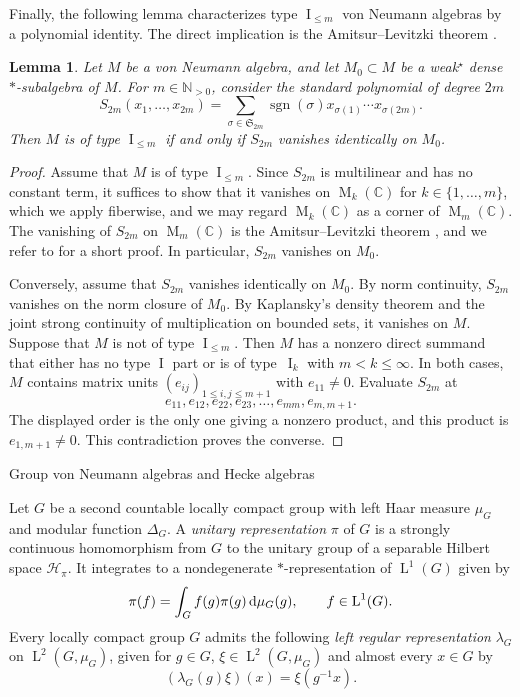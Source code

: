 \documentclass[11pt]{amsart}
\makeatletter
\numberwithin{equation}{section}
\def\subsection{\@startsection{subsection}{2}%
  \z@{.7\linespacing\@plus.7\linespacing}{.3\linespacing}%
  {\normalfont\bfseries}}
\newcommand{\nn}{\mathbb N}
\newcommand{\cc}{\mathbb C}
\renewcommand{\H}{\mathcal H}
\DeclareMathOperator{\I}{I}
\DeclareMathOperator{\sgn}{sgn}
\newcommand{\Sym}{\mathfrak S}
\newcommand{\rL}{\operatorname{L}}
\newcommand{\rM}{\operatorname{M}}
\newtheorem{Lem}[The]{Lemma}
\theoremstyle{definition}
\makeatother
\begin{document}
Finally, the following lemma characterizes type $\I_{\leq m}$ von Neumann algebras by a polynomial identity. The direct implication is the Amitsur--Levitzki theorem \cite{AL50}.

\begin{Lem}
    \label{lem:standard-identity}
    Let $M$ be a von Neumann algebra, and let $M_0\subset M$ be a weak$^\star$ dense $*$-subalgebra of $M$. For $m\in\nn_{>0}$, consider the \emph{standard polynomial} of degree $2m$ 
    $$
        S_{2m}(x_1,\ldots,x_{2m})
        =\sum_{\sigma\in\Sym_{2m}}
        \sgn(\sigma)x_{\sigma(1)}\cdots x_{\sigma(2m)}.
    $$
     Then $M$ is of type $\I_{\leq m}$ if and only if $S_{2m}$ vanishes identically on $M_0$.
\end{Lem}

\begin{proof}
    Assume that $M$ is of type $\I_{\leq m}$. Since $S_{2m}$ is multilinear and has no constant term, it suffices to show that it vanishes on $\rM_k(\cc)$ for $k\in\{1,\ldots,m\}$, which we apply fiberwise, and we may regard $\rM_k(\cc)$ as a corner of $\rM_m(\cc)$. The vanishing of $S_{2m}$ on $\rM_m(\cc)$ is the Amitsur--Levitzki theorem \cite{AL50}, and we refer to \cite{Ro76} for a short proof. In particular, $S_{2m}$ vanishes on $M_0$.

    Conversely, assume that $S_{2m}$ vanishes identically on $M_0$. By norm continuity, $S_{2m}$ vanishes on the norm closure of $M_0$. By Kaplansky's density theorem and the joint strong continuity of multiplication on bounded sets, it vanishes on $M$. Suppose that $M$ is not of type $\I_{\leq m}$. Then $M$ has a nonzero direct summand that either has no type $\I$ part or is of type~$\I_k$ with $m<k\leq\infty$. In both cases, $M$ contains matrix units $(e_{ij})_{1\leq i,j\leq m+1}$ with $e_{11}\ne0$. Evaluate $S_{2m}$ at
    $$
        e_{11},e_{12},e_{22},e_{23},\ldots,e_{mm},e_{m,m+1}.
    $$
    The displayed order is the only one giving a nonzero product, and this product is $e_{1,m+1}\ne0$. This contradiction proves the converse.
\end{proof}


\subsection{Group von Neumann algebras and Hecke algebras}
\label{subsec:prelim-group-vna}

Let $G$ be a second countable locally compact group with left Haar measure $\mu_G$ and modular function $\Delta_G$. A \emph{unitary representation} $\pi$ of $G$ is a strongly continuous homomorphism from $G$ to the unitary group of a separable Hilbert space $\H_\pi$. It integrates to a nondegenerate $*$-representation of $\rL^1(G)$ given by
$$
    \pi(f)=\int_G f(g)\pi(g)\,{\rm d}\mu_G(g),\qquad f\in\rL^1(G).
$$
Every locally compact group $G$ admits the following \emph{left regular representation} $\lambda_G$ on $\rL^2(G,\mu_G)$, given for $g\in G$, $\xi\in\rL^2(G,\mu_G)$ and almost every $x\in G$ by $$(\lambda_G(g)\xi)(x)=\xi(g^{-1}x).$$ 
\end{document}
